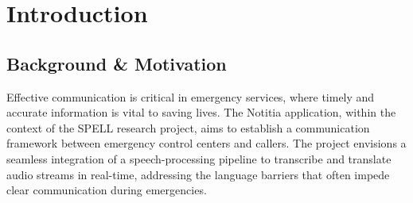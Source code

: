 \chapter{Introduction}

\label{Chapter1}


\newcommand{\keyword}[1]{\textbf{#1}}
\newcommand{\tabhead}[1]{\textbf{#1}}
\newcommand{\code}[1]{\texttt{#1}}
\newcommand{\file}[1]{\texttt{\bfseries#1}}
\newcommand{\option}[1]{\texttt{\itshape#1}}


\section{Background \& Motivation}


Effective communication is critical in emergency services, where timely and accurate information is vital to 
saving lives. The Notitia application, within the context of the SPELL research project, aims to establish a 
communication framework between emergency control centers and callers. The project envisions a seamless integration of 
a speech-processing pipeline to transcribe and translate audio streams in real-time, addressing the language barriers 
that often impede clear communication during emergencies.

